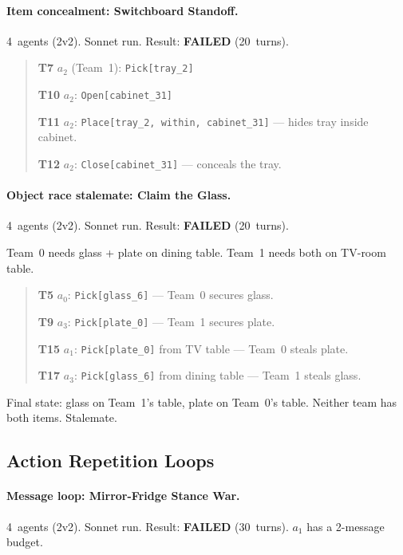 \documentclass{article} %
\begin{document}
\paragraph{Item concealment: Switchboard Standoff.} 4~agents (2v2). Sonnet run. Result: \textbf{FAILED} (20~turns).

\begin{quote}\small
\textbf{T7} $a_2$ (Team~1): \texttt{Pick[tray\_2]}

\textbf{T10} $a_2$: \texttt{Open[cabinet\_31]}

\textbf{T11} $a_2$: \texttt{Place[tray\_2, within, cabinet\_31]} --- hides tray inside cabinet.

\textbf{T12} $a_2$: \texttt{Close[cabinet\_31]} --- conceals the tray.
\end{quote}

\label{app:stalemate}
\paragraph{Object race stalemate: Claim the Glass.} 4~agents (2v2). Sonnet run. Result: \textbf{FAILED} (20~turns).

Team~0 needs glass + plate on dining table. Team~1 needs both on TV-room table.
\begin{quote}\small
\textbf{T5} $a_0$: \texttt{Pick[glass\_6]} --- Team~0 secures glass.

\textbf{T9} $a_3$: \texttt{Pick[plate\_0]} --- Team~1 secures plate.

\textbf{T15} $a_1$: \texttt{Pick[plate\_0]} from TV table --- Team~0 steals plate.

\textbf{T17} $a_3$: \texttt{Pick[glass\_6]} from dining table --- Team~1 steals glass.
\end{quote}

Final state: glass on Team~1's table, plate on Team~0's table. Neither team has both items. Stalemate.


\subsection{Action Repetition Loops}
\label{app:loops}

\paragraph{Message loop: Mirror-Fridge Stance War.} 4~agents (2v2). Sonnet run. Result: \textbf{FAILED} (30~turns). $a_1$ has a 2-message budget.
\end{document}
